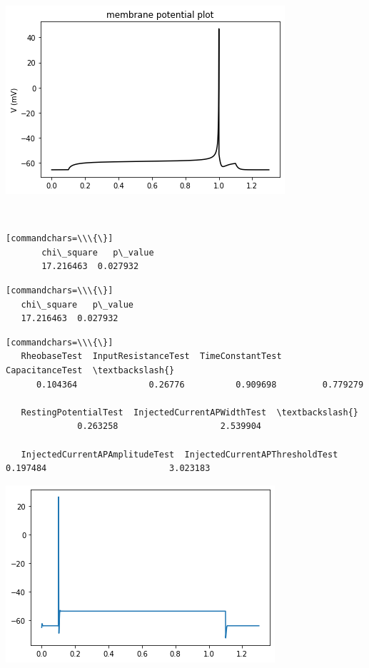     

\begin{center}
   \includegraphics[width=0.7\linewidth]{notebooks_converted/make_normal_distribution_files/make_normal_distribution_8_2}
\end{center}
{ \hspace*{\fill} \\}

            
    \begin{verbatim}[commandchars=\\\{\}]
       chi\_square   p\_value
       17.216463  0.027932
    \end{verbatim}

\begin{verbatim}[commandchars=\\\{\}]
   chi\_square   p\_value
   17.216463  0.027932
\end{verbatim}

\begin{verbatim}[commandchars=\\\{\}]
   RheobaseTest  InputResistanceTest  TimeConstantTest  CapacitanceTest  \textbackslash{}
      0.104364              0.26776          0.909698         0.779279

   RestingPotentialTest  InjectedCurrentAPWidthTest  \textbackslash{}
              0.263258                    2.539904

   InjectedCurrentAPAmplitudeTest  InjectedCurrentAPThresholdTest                        0.197484                        3.023183
\end{verbatim}

\begin{center}
    \includegraphics[width=0.7\linewidth]{notebooks_converted/make_normal_distribution_files/make_normal_distribution_15_0}
\end{center}

